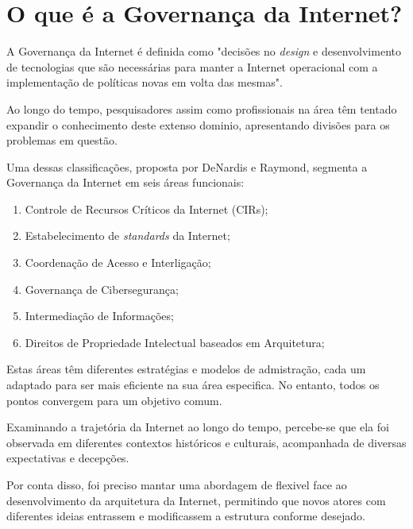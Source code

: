 \section{O que é a Governança da Internet?}
\label{sec:internetgovernance}
A Governança da Internet é definida como "decisões no \textit{design} e desenvolvimento 
de tecnologias que são necessárias para manter a Internet operacional com a implementação
de políticas novas em volta das mesmas".

Ao longo do tempo, pesquisadores assim como profissionais na área têm tentado expandir o 
conhecimento deste extenso dominio, apresentando divisões para os problemas em questão.

Uma dessas classificações, proposta por DeNardis e Raymond, segmenta a Governança da Internet em seis áreas funcionais:

\begin{enumerate}
  \item Controle de Recursos Críticos da Internet (CIRs);
  \item Estabelecimento de \textit{standards} da Internet;
  \item Coordenação de Acesso e Interligação;
  \item Governança de Cibersegurança;
  \item Intermediação de Informações;
  \item Direitos de Propriedade Intelectual baseados em Arquitetura;
\end{enumerate}

Estas áreas têm diferentes estratégias e modelos de admistração, cada um adaptado
para ser mais eficiente na sua área especifica. No entanto, todos os pontos 
convergem para um objetivo comum.

Examinando a trajetória da Internet ao longo do tempo, percebe-se que ela foi 
observada em diferentes contextos históricos e culturais, acompanhada de 
diversas expectativas e decepções.

Por conta disso, foi preciso mantar uma abordagem de flexivel face ao desenvolvimento
da arquitetura da Internet, permitindo que novos atores com diferentes ideias entrassem 
e modificassem a estrutura conforme desejado.




